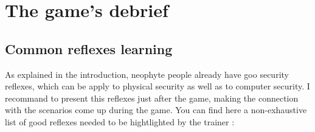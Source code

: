 \documentclass[11pt]{article} %
\begin{document}

\section{The game's debrief}
\subsection{Common reflexes learning}
As explained in the introduction, neophyte people already have goo security 
reflexes, which can be apply to physical security as well as to computer 
security. I recommand to present this reflexes just after the game, making the
connection with the scenarios come up during the game. You can find here 
a non-exhaustive list of good reflexes needed to be hightlighted by the trainer : 
\end{document}
